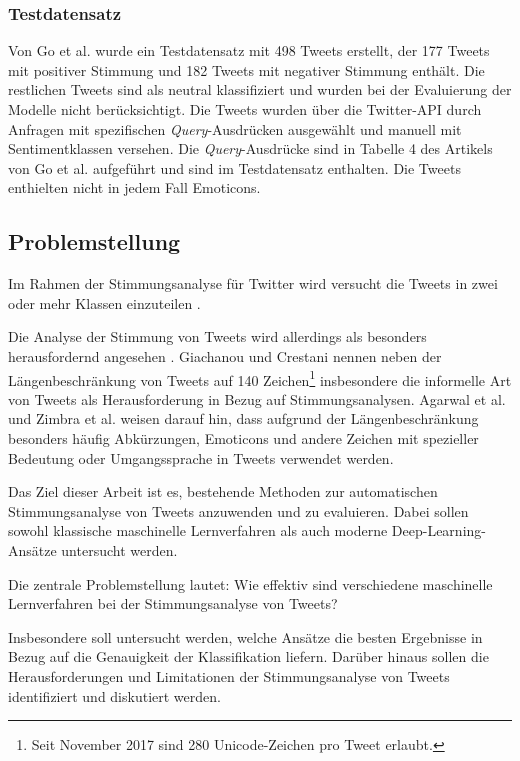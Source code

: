 \subsubsection{Testdatensatz}\label{subsec:testdata}

Von Go et al. \cite{go2009twitter} wurde ein Testdatensatz mit 498 Tweets erstellt, der 177 Tweets mit positiver Stimmung und 182 Tweets mit negativer Stimmung enthält.
Die restlichen Tweets sind als neutral klassifiziert und wurden bei der Evaluierung der Modelle nicht berücksichtigt.
Die Tweets wurden über die Twitter-API durch Anfragen mit spezifischen \textit{Query}-Ausdrücken ausgewählt und manuell mit Sentimentklassen versehen.
Die \textit{Query}-Ausdrücke sind in Tabelle 4 des Artikels von Go et al. \cite[S. 5]{go2009twitter} aufgeführt und sind im Testdatensatz enthalten.
Die Tweets enthielten nicht in jedem Fall Emoticons.

\subsection{Problemstellung}

Im Rahmen der Stimmungsanalyse für Twitter wird versucht die Tweets in zwei oder mehr Klassen einzuteilen \cite{zimbra2018state}.

Die Analyse der Stimmung von Tweets wird allerdings als besonders herausfordernd angesehen \cite{agarwal2011sentiment, giachanou2016like, zimbra2018state}.
Giachanou und Crestani \cite{giachanou2016like} nennen neben der Längenbeschränkung von Tweets auf 140 Zeichen\footnote{
    Seit November 2017 sind 280 Unicode-Zeichen pro Tweet erlaubt.
} insbesondere die informelle Art von Tweets als Herausforderung in Bezug auf Stimmungsanalysen.
Agarwal et al. \cite{agarwal2011sentiment} und Zimbra et al. \cite{zimbra2018state} weisen darauf hin, dass aufgrund der Längenbeschränkung besonders häufig Abkürzungen, Emoticons und andere Zeichen mit spezieller Bedeutung oder Umgangssprache in Tweets verwendet werden.
\newline

Das Ziel dieser Arbeit ist es, bestehende Methoden zur automatischen Stimmungsanalyse von Tweets anzuwenden und zu evaluieren.
Dabei sollen sowohl klassische maschinelle Lernverfahren als auch moderne Deep-Learning-Ansätze untersucht werden.

Die zentrale Problemstellung lautet: Wie effektiv sind verschiedene maschinelle Lernverfahren bei der Stimmungsanalyse von Tweets?

Insbesondere soll untersucht werden, welche Ansätze die besten Ergebnisse in Bezug auf die Genauigkeit der Klassifikation liefern.
Darüber hinaus sollen die Herausforderungen und Limitationen der Stimmungsanalyse von Tweets identifiziert und diskutiert werden.
